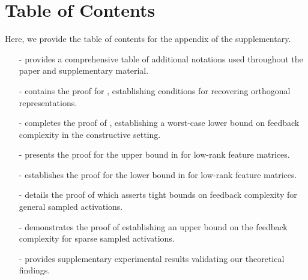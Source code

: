 \section{Table of Contents}
Here, we provide the table of contents for the appendix of the supplementary.

\begin{itemize}
\item[-]  provides a comprehensive table of additional notations used throughout the paper and supplementary material.
\item[-]  contains the proof for , establishing conditions for recovering orthogonal representations.\vspace{2mm}

\item[-]  completes the proof of , establishing a worst-case lower bound on feedback complexity in the constructive setting.\vspace{2mm}

\item[-]  presents the proof for the upper bound in  for low-rank feature matrices.\vspace{2mm}

\item[-]  establishes the proof for the lower bound in  for low-rank feature matrices.\vspace{2mm}

\item[-]  details the proof of  which asserts tight bounds on feedback complexity for general sampled activations.\vspace{2mm}

\item[-]  demonstrates the proof of  establishing an upper bound on the feedback complexity for sparse sampled activations.\vspace{2mm}

\item[-]  provides supplementary experimental results validating our theoretical findings.\vspace{2mm}
\end{itemize}
\newpage

